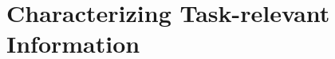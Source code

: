 \setcounter{chapter}{2}



\chapter{Characterizing Task-relevant Information}
\label{ch:characterizing}
